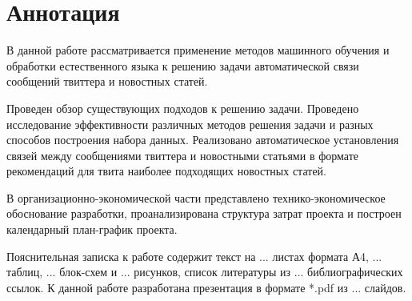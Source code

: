 \section*{Аннотация}

В данной работе рассматривается применение методов машинного обучения и обработки естественного языка к решению задачи автоматической связи сообщений твиттера и новостных статей.

Проведен обзор существующих подходов к решению задачи.
Проведено исследование эффективности различных методов решения задачи и разных способов построения набора данных.
Реализовано автоматическое установления связей между сообщениями твиттера и новостными статьями в формате рекомендаций для твита наиболее подходящих новостных статей.

В организационно-экономической части представлено технико-экономическое обоснование разработки, проанализирована структура затрат проекта и построен календарный план-график проекта.

Пояснительная записка к работе содержит текст на ... листах формата А4, ... таблиц, ... блок-схем и ... рисунков, список литературы из ... библиографических ссылок. К данной работе разработана презентация в формате *.pdf из ... слайдов.
